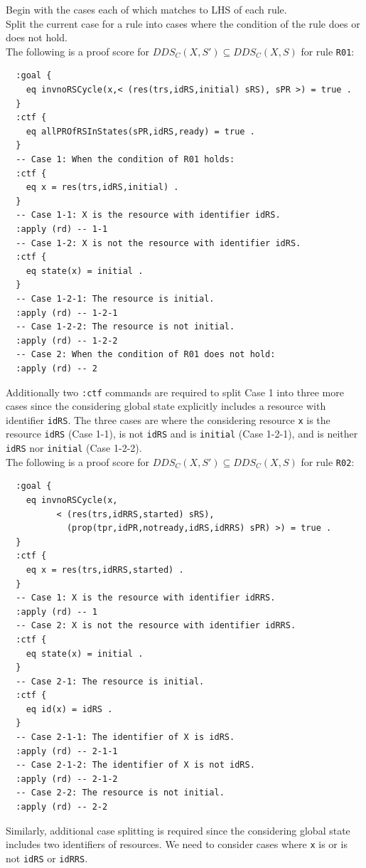 \documentclass[12pt]{report}
\begin{document}
 Begin with the cases each of which matches to
LHS of each rule. \\ 
 Split the current case for a rule into
cases where the condition of the rule does or does not hold. \\

The following is a proof score for $\mathit{DDS_C}(X,S')\subseteq \mathit{DDS_C}(X,S)$ for
rule {\tt R01}:
\small
\begin{verbatim}
  :goal {
    eq invnoRSCycle(x,< (res(trs,idRS,initial) sRS), sPR >) = true .
  }
  :ctf {
    eq allPROfRSInStates(sPR,idRS,ready) = true .
  }
  -- Case 1: When the condition of R01 holds:
  :ctf {
    eq x = res(trs,idRS,initial) .
  }
  -- Case 1-1: X is the resource with identifier idRS.
  :apply (rd) -- 1-1
  -- Case 1-2: X is not the resource with identifier idRS.
  :ctf {
    eq state(x) = initial .
  }
  -- Case 1-2-1: The resource is initial.
  :apply (rd) -- 1-2-1
  -- Case 1-2-2: The resource is not initial.
  :apply (rd) -- 1-2-2
  -- Case 2: When the condition of R01 does not hold:
  :apply (rd) -- 2
\end{verbatim}
\normalsize
Additionally two {\tt :ctf} commands are required to split Case 1 into
three more cases since the considering global state explicitly
includes a resource with identifier {\tt idRS}. The three cases are
where the considering resource {\tt x} is the resource {\tt idRS}
(Case 1-1), is not {\tt idRS} and is {\tt initial} (Case 1-2-1), and
is neither {\tt idRS} nor {\tt initial} (Case 1-2-2).\\

The following is a proof score for $\mathit{DDS_C}(X,S')\subseteq \mathit{DDS_C}(X,S)$ for
rule {\tt R02}:
\small
\begin{verbatim}
  :goal {
    eq invnoRSCycle(x,
          < (res(trs,idRRS,started) sRS), 
            (prop(tpr,idPR,notready,idRS,idRRS) sPR) >) = true .
  }
  :ctf {
    eq x = res(trs,idRRS,started) .
  }
  -- Case 1: X is the resource with identifier idRRS.
  :apply (rd) -- 1
  -- Case 2: X is not the resource with identifier idRRS.
  :ctf {
    eq state(x) = initial .
  }
  -- Case 2-1: The resource is initial.
  :ctf {
    eq id(x) = idRS .
  }
  -- Case 2-1-1: The identifier of X is idRS.
  :apply (rd) -- 2-1-1
  -- Case 2-1-2: The identifier of X is not idRS.
  :apply (rd) -- 2-1-2
  -- Case 2-2: The resource is not initial.
  :apply (rd) -- 2-2
\end{verbatim}
\normalsize
Similarly, additional case splitting is required since the considering
global state includes two identifiers of resources. We need to
consider cases where {\tt x} is or is not {\tt idRS} or {\tt idRRS}.
\end{document}
